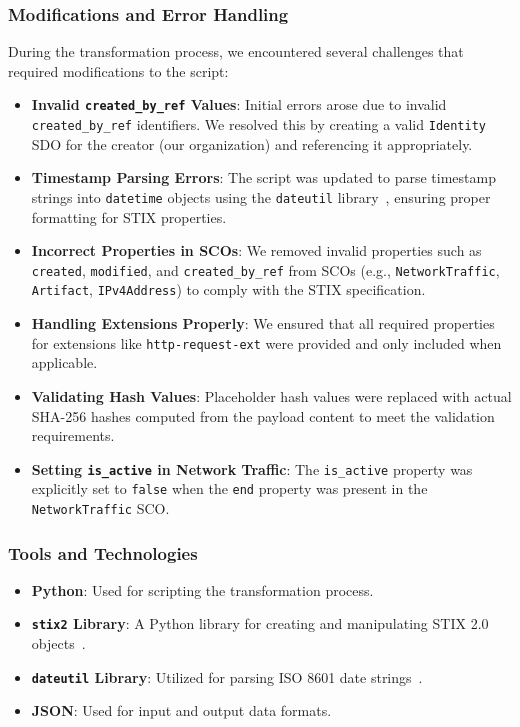 \documentclass[conference]{IEEEtran}
\begin{document}
\subsubsection{Modifications and Error Handling}

During the transformation process, we encountered several challenges that required modifications to the script:

\begin{itemize}
    \item \textbf{Invalid \texttt{created\_by\_ref} Values}: Initial errors arose due to invalid \texttt{created\_by\_ref} identifiers. We resolved this by creating a valid \texttt{Identity} SDO for the creator (our organization) and referencing it appropriately.
    
    \item \textbf{Timestamp Parsing Errors}: The script was updated to parse timestamp strings into \texttt{datetime} objects using the \texttt{dateutil} library~\cite{dateutil}, ensuring proper formatting for STIX properties.

    \item \textbf{Incorrect Properties in SCOs}: We removed invalid properties such as \texttt{created}, \texttt{modified}, and \texttt{created\_by\_ref} from SCOs (e.g., \texttt{NetworkTraffic}, \texttt{Artifact}, \texttt{IPv4Address}) to comply with the STIX specification.

    \item \textbf{Handling Extensions Properly}: We ensured that all required properties for extensions like \texttt{http-request-ext} were provided and only included when applicable.

    \item \textbf{Validating Hash Values}: Placeholder hash values were replaced with actual SHA-256 hashes computed from the payload content to meet the validation requirements.

    \item \textbf{Setting \texttt{is\_active} in Network Traffic}: The \texttt{is\_active} property was explicitly set to \texttt{false} when the \texttt{end} property was present in the \texttt{NetworkTraffic} SCO.
\end{itemize}

\subsubsection{Tools and Technologies}

\begin{itemize}
    \item \textbf{Python}: Used for scripting the transformation process.
    \item \textbf{\texttt{stix2} Library}: A Python library for creating and manipulating STIX 2.0 objects~\cite{stix2python}.
    \item \textbf{\texttt{dateutil} Library}: Utilized for parsing ISO 8601 date strings~\cite{dateutil}.
    \item \textbf{JSON}: Used for input and output data formats.
\end{itemize}
\end{document}
